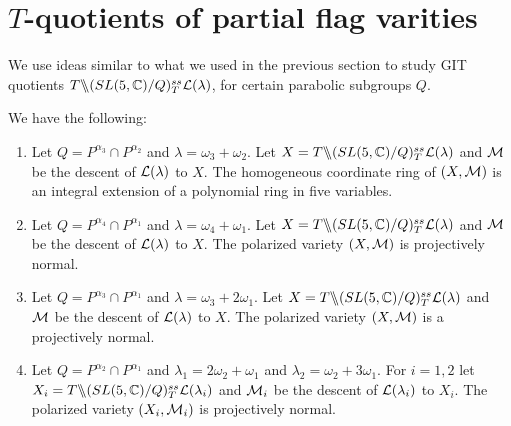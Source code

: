 \section{$T$-quotients of partial flag varities}
\label{sec:fv_normality}
We use ideas similar to what we used in the previous section to study GIT quotients $T\backslash\mkern-6mu\backslash(SL(5, \mathbb{C}) \allowbreak /Q)^{ss}_{T} {\mathcal L}(\lambda)$, for certain parabolic subgroups $Q$. 

\begin{theorem}
\label{thm:flag}
    We have the following:
\begin{enumerate}
    \item Let $Q = P^{\alpha_3} \cap P^{\alpha_2}$ and $\lambda = \omega_3 + \omega_2$. Let $X = T \backslash\mkern-6mu\backslash (SL(5,\mathbb{C})/Q)^{ss}_T {\cal L}(\lambda)$ and \(\cal M\) be the descent of \(\cal L(\lambda)\) to \(X\).  The homogeneous coordinate ring of $(X,{\cal M})$ is an integral extension of a polynomial ring in five variables.
    \item Let $Q = P^{\alpha_4} \cap P^{\alpha_1}$ and $\lambda = \omega_4 + \omega_1$. Let $X = T \backslash\mkern-6mu\backslash (SL(5,\mathbb{C})/Q)^{ss}_T {\cal L}(\lambda)$ and \(\cal M\) be the descent of \({\cal L}(\lambda)\) to \(X\). The polarized variety $(X,{\cal M})$ is projectively normal.
    \item Let $Q = P^{\alpha_3} \cap P^{\alpha_1}$ and $\lambda = \omega_3 + 2\omega_1$. Let $X = T \backslash\mkern-6mu\backslash (SL(5,\mathbb{C})/Q)^{ss}_T {\cal L}(\lambda)$ and \(\cal M\) be the descent of \({\cal L}(\lambda)\) to \(X\). The polarized variety $(X,{\cal M})$ is a projectively normal.
    \item Let $Q= P^{\alpha_2} \cap P^{\alpha_1}$ and $\lambda_1 = 2\omega_2 + \omega_1$ and $\lambda_2 = \omega_2 + 3 \omega_1$. For $i=1,2$ let $X_i = T \backslash\mkern-6mu\backslash (SL(5,\mathbb{C})/Q)^{ss}_T {\cal L}(\lambda_i)$ and \({\cal M}_i\) be the descent of \({\cal L}(\lambda_i)\) to \(X_i\).  The polarized variety $(X_i,{\cal M}_i)$ is projectively normal.
\end{enumerate}
\end{theorem}

